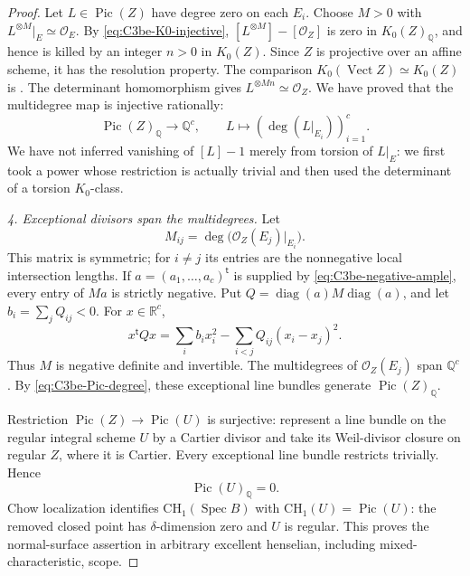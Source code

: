 \begin{proof}
Let \(L\in\operatorname{Pic}(Z)\) have degree zero on each
\(E_i\). Choose \(M>0\) with
\(L^{\otimes M}|_E\simeq\mathcal O_E\).
By \eqref{eq:C3be-K0-injective},
\([L^{\otimes M}]-[\mathcal O_Z]\) is zero in
\(K_0(Z)_{\mathbb Q}\), and hence is killed by an integer
\(n>0\) in \(K_0(Z)\). Since \(Z\) is projective over an
affine scheme, it has the resolution property. The comparison
\(K_0(\operatorname{Vect}Z)\simeq K_0(Z)\) is
\citet[Lemma 36.38.5, Tag 0FDJ]{frC3beStacksVectorK0}.
The determinant homomorphism
\citep[Section 17.26 and Lemma 17.26.1, Tag 0B37]
{frC3beStacksDeterminant} gives
\(L^{\otimes Mn}\simeq\mathcal O_Z\). We have proved that
the multidegree map is injective rationally:
\begin{equation}\label{eq:C3be-Pic-degree}
 \operatorname{Pic}(Z)_{\mathbb Q}\longrightarrow\mathbb Q^c,
 \qquad L\longmapsto(\deg(L|_{E_i}))_{i=1}^{c}.
\end{equation}
We have not inferred vanishing of \([L]-1\) merely from
torsion of \(L|_E\): we first took a power whose restriction
is actually trivial and then used the determinant of a
torsion \(K_0\)-class.

\emph{4. Exceptional divisors span the multidegrees.}
Let
\[
              M_{ij}=\deg\bigl(\mathcal O_Z(E_j)|_{E_i}\bigr).
\]
This matrix is symmetric; for \(i\ne j\) its entries are the
nonnegative local intersection lengths. If
\(a=(a_1,\ldots,a_c)^{\mathsf t}\) is supplied by
\eqref{eq:C3be-negative-ample}, every entry of \(Ma\) is
strictly negative. Put
\(Q=\operatorname{diag}(a)M\operatorname{diag}(a)\), and let
\(b_i=\sum_jQ_{ij}<0\). For \(x\in\mathbb R^c\),
\[
 x^{\mathsf t}Qx
       =\sum_i b_i x_i^2
          -\sum_{i<j}Q_{ij}(x_i-x_j)^2.
\]
Thus \(M\) is negative definite and invertible. The multidegrees
of \(\mathcal O_Z(E_j)\) span \(\mathbb Q^c\).
By \eqref{eq:C3be-Pic-degree}, these exceptional line bundles
generate \(\operatorname{Pic}(Z)_{\mathbb Q}\).

Restriction \(\operatorname{Pic}(Z)\to\operatorname{Pic}(U)\)
is surjective: represent a line bundle on the regular integral
scheme \(U\) by a Cartier divisor and take its Weil-divisor
closure on regular \(Z\), where it is Cartier.
Every exceptional line bundle restricts trivially. Hence
\begin{equation}\label{eq:C3be-surface-Pic-zero}
                     \operatorname{Pic}(U)_{\mathbb Q}=0.
\end{equation}
Chow localization identifies
\(\mathrm{CH}_1(\operatorname{Spec}B)\) with
\(\mathrm{CH}_1(U)=\operatorname{Pic}(U)\): the removed
closed point has \(\delta\)-dimension zero and \(U\) is regular.
This proves the normal-surface assertion in arbitrary excellent
henselian, including mixed-characteristic, scope.


\end{proof}
